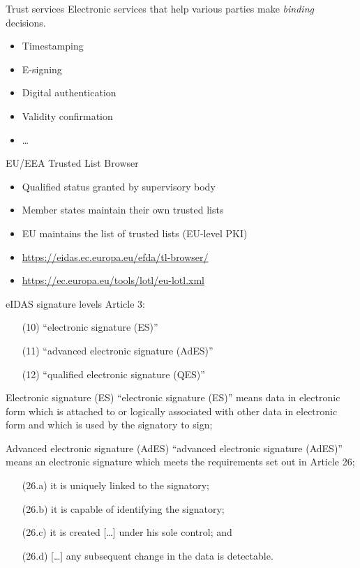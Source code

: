 \begin{frame}{Trust services}
  Electronic services that help various parties make \emph{binding} decisions.
  \begin{itemize}[<+(1)->]
    \item Timestamping
    \item E-signing
    \item Digital authentication
    \item Validity confirmation
    \item \dots
  \end{itemize}

  \pause
  EU/EEA Trusted List Browser
  \begin{itemize}[<+(1)->]
    \item Qualified status granted by supervisory body
    \item Member states maintain their own trusted lists
    \item EU maintains the list of trusted lists (EU-level PKI)
    \item {\scriptsize \url{https://eidas.ec.europa.eu/efda/tl-browser/}}
    \item {\scriptsize \url{https://ec.europa.eu/tools/lotl/eu-lotl.xml}}
  \end{itemize}
\end{frame}

\begin{frame}{eIDAS signature levels}
  Article 3:
  \settowidth{\offset}{10}
  \addtolength{\leftmargini}{\offset}
  \begin{itemize}[<+(1)->]
    \item[(10)] \enquote{electronic signature (ES)}
    \item[(11)] \enquote{advanced electronic signature (AdES)}
    \item[(12)] \enquote{qualified electronic signature (QES)}
  \end{itemize}
\end{frame}

\begin{frame}{Electronic signature (ES)}
  \enquote{electronic signature (ES)} means data in electronic form which is attached to or logically associated with other data in electronic form and which is used by the signatory to sign;
\end{frame}

\begin{frame}{Advanced electronic signature (AdES)}
  \enquote{advanced electronic signature (AdES)} means an electronic signature which meets the requirements set out in Article 26;
  \settowidth{\offset}{26.1}
  \addtolength{\leftmargini}{\offset}
  \begin{enumerate}[<+(1)->]
    \item[(26.a)] it is uniquely linked to the signatory;
    \item[(26.b)] it is capable of identifying the signatory;
    \item[(26.c)] it is created [\dots] under his sole control; and
    \item[(26.d)] [\dots] any subsequent change in the data is detectable.
  \end{enumerate}
\end{frame}

